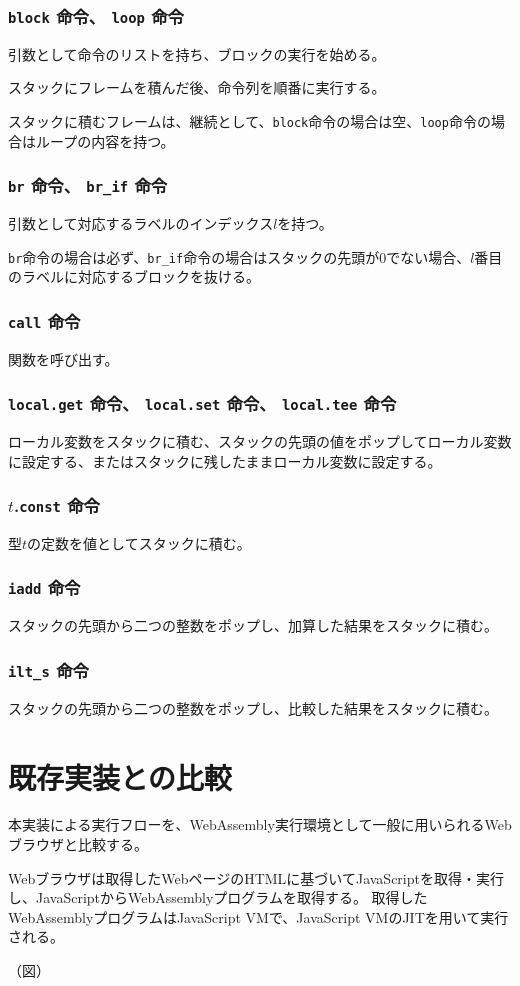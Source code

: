 \subsubsection{{\tt block} 命令、 {\tt loop} 命令}

引数として命令のリストを持ち、ブロックの実行を始める。

スタックにフレームを積んだ後、命令列を順番に実行する。

スタックに積むフレームは、継続として、\verb|block|命令の場合は空、\verb|loop|命令の場合はループの内容を持つ。

\subsubsection{{\tt br} 命令、 {\tt br\_if} 命令}

引数として対応するラベルのインデックス$l$を持つ。

\verb|br|命令の場合は必ず、\verb|br_if|命令の場合はスタックの先頭が0でない場合、$l$番目のラベルに対応するブロックを抜ける。

\subsubsection{{\tt call} 命令}

関数を呼び出す。

\subsubsection{{\tt local.get} 命令、 {\tt local.set} 命令、 {\tt local.tee} 命令}

ローカル変数をスタックに積む、スタックの先頭の値をポップしてローカル変数に設定する、またはスタックに残したままローカル変数に設定する。

\subsubsection{$t$.{\tt const} 命令}

型$t$の定数を値としてスタックに積む。

\subsubsection{{\tt iadd} 命令}

スタックの先頭から二つの整数をポップし、加算した結果をスタックに積む。

\subsubsection{{\tt ilt\_s} 命令}

スタックの先頭から二つの整数をポップし、比較した結果をスタックに積む。

\section{既存実装との比較}

本実装による実行フローを、WebAssembly実行環境として一般に用いられるWebブラウザと比較する。

Webブラウザは取得したWebページのHTMLに基づいてJavaScriptを取得・実行し、JavaScriptからWebAssemblyプログラムを取得する。
取得したWebAssemblyプログラムはJavaScript VMで、JavaScript VMのJITを用いて実行される。

（図）
